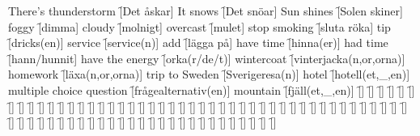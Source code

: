 \begin{questions}
\begin{multicols}{2}
        \question There's thunderstorm \f[Det åskar]
        \question It snows \f[Det snöar]
        \question Sun shines \f[Solen skiner]
        \question foggy \f[dimma]
        \question cloudy \f[molnigt]
        \question overcast \f[mulet]
        \question stop smoking \f[sluta röka]
        \question tip \f[dricks(en)]
        \question service \f[service(n)]
        \question add \f[lägga på]
        \question have time \f[hinna(er)]
        \question had time \f[hann/hunnit]
        \question have the energy \f[orka(r/de/t)]
        \question wintercoat \f[vinterjacka(n,or,orna)]
        \question homework \f[läxa(n,or,orna)]
        \question trip to Sweden \f[Sverigeresa(n)]
        \question hotel \f[hotell(et,\_,en)]
        \question multiple choice question \f[frågealternativ(en)]
        \question mountain \f[fjäll(et,\_,en)]
        \question  \f[]
        \question  \f[]
        \question  \f[]
        \question  \f[]
        \question  \f[]
        \question  \f[]
        \question  \f[]
        \question  \f[]
        \question  \f[]
        \question  \f[]
        \question  \f[]
        \question  \f[]
        \question  \f[]
        \question  \f[]
        \question  \f[]
        \question  \f[]
        \question  \f[]
        \question  \f[]
        \question  \f[]
        \question  \f[]
        \question  \f[]
        \question  \f[]
        \question  \f[]
        \question  \f[]
        \question  \f[]
        \question  \f[]
        \question  \f[]
        \question  \f[]
        \question  \f[]
        \question  \f[]
        \question  \f[]
        \question  \f[]
        \question  \f[]
        \question  \f[]
        \question  \f[]
        \question  \f[]
        \question  \f[]
        \question  \f[]
        \question  \f[]
        \question  \f[]
        \question  \f[]
        \question  \f[]
        \question  \f[]
        \question  \f[]
        \question  \f[]
        \question  \f[]
        \question  \f[]
        \question  \f[]
        \question  \f[]
        \question  \f[]
        \question  \f[]
        \question  \f[]
        \question  \f[]
        \question  \f[]
        \question  \f[]
        \question  \f[]
        \question  \f[]
        \question  \f[]
        \question  \f[]
        \question  \f[]
        \question  \f[]
        \question  \f[]
        \question  \f[]
        \question  \f[]
        \question  \f[]
        \question  \f[]
        \question  \f[]
        \question  \f[]
        \question  \f[]
        \question  \f[]
        \question  \f[]
        \question  \f[]
        \question  \f[]

\end{multicols}
\end{questions}
